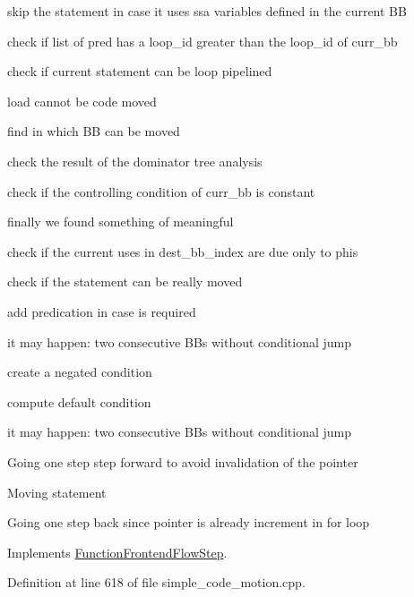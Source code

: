 skip the statement in case it uses ssa variables defined in the current BB

check if list of pred has a loop\+\_\+id greater than the loop\+\_\+id of curr\+\_\+bb

check if current statement can be loop pipelined

load cannot be code moved

find in which BB can be moved

check the result of the dominator tree analysis

check if the controlling condition of curr\+\_\+bb is constant

finally we found something of meaningful

check if the current uses in dest\+\_\+bb\+\_\+index are due only to phis

check if the statement can be really moved

add predication in case is required

it may happen\+: two consecutive B\+Bs without conditional jump

create a negated condition

compute default condition

it may happen\+: two consecutive B\+Bs without conditional jump

Going one step step forward to avoid invalidation of the pointer

Moving statement

Going one step back since pointer is already increment in for loop 

Implements \hyperlink{classFunctionFrontendFlowStep_a00612f7fb9eabbbc8ee7e39d34e5ac68}{Function\+Frontend\+Flow\+Step}.



Definition at line 618 of file simple\+\_\+code\+\_\+motion.\+cpp.




